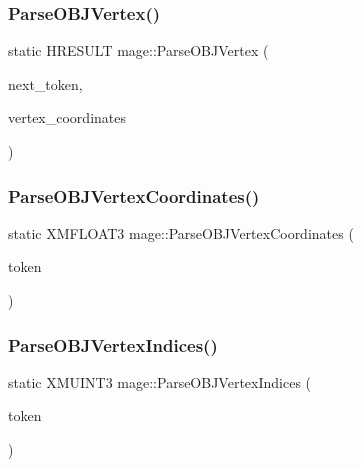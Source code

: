 \hypertarget{namespacemage_a564204c30bfe0ead7f0b4f3c76cefa2d}{}\label{namespacemage_a564204c30bfe0ead7f0b4f3c76cefa2d} 
\subsubsection{\texorpdfstring{Parse\+O\+B\+J\+Vertex()}{ParseOBJVertex()}}
{\footnotesize\ttfamily static H\+R\+E\+S\+U\+LT mage\+::\+Parse\+O\+B\+J\+Vertex (\begin{DoxyParamCaption}\item[{char $\ast$$\ast$}]{next\+\_\+token,  }\item[{vector$<$ X\+M\+F\+L\+O\+A\+T3 $>$ \&}]{vertex\+\_\+coordinates }\end{DoxyParamCaption})\hspace{0.3cm}{\ttfamily [static]}}

\hypertarget{namespacemage_a694cf999c8539cfcd6afbb31fb2d27cd}{}\label{namespacemage_a694cf999c8539cfcd6afbb31fb2d27cd} 
\subsubsection{\texorpdfstring{Parse\+O\+B\+J\+Vertex\+Coordinates()}{ParseOBJVertexCoordinates()}}
{\footnotesize\ttfamily static X\+M\+F\+L\+O\+A\+T3 mage\+::\+Parse\+O\+B\+J\+Vertex\+Coordinates (\begin{DoxyParamCaption}\item[{const char $\ast$}]{token }\end{DoxyParamCaption})\hspace{0.3cm}{\ttfamily [static]}}

\hypertarget{namespacemage_afe94a043cb3be4de3549098b7ad7a326}{}\label{namespacemage_afe94a043cb3be4de3549098b7ad7a326} 
\subsubsection{\texorpdfstring{Parse\+O\+B\+J\+Vertex\+Indices()}{ParseOBJVertexIndices()}}
{\footnotesize\ttfamily static X\+M\+U\+I\+N\+T3 mage\+::\+Parse\+O\+B\+J\+Vertex\+Indices (\begin{DoxyParamCaption}\item[{const char $\ast$}]{token }\end{DoxyParamCaption})\hspace{0.3cm}{\ttfamily [static]}}

